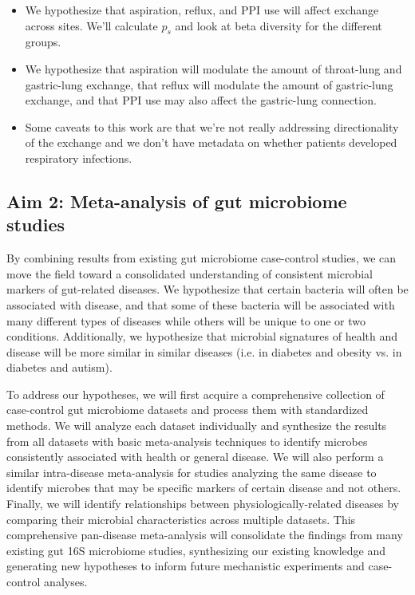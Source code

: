 \documentclass[12pt]{article}
\begin{document}
\begin{itemize}
\item We hypothesize that aspiration, reflux, and PPI use will affect exchange across sites. We'll calculate $p_s$ and look at beta diversity for the different groups.
\item We hypothesize that aspiration will modulate the 
amount of throat-lung and gastric-lung exchange, that reflux will modulate 
the amount of gastric-lung exchange, and that PPI use may also affect
the gastric-lung connection.
\item Some caveats to this work are that we're not really addressing directionality of the exchange and we don't have metadata on whether patients developed respiratory infections.
\end{itemize}

\subsection{Aim 2: Meta-analysis of gut microbiome studies}\label{sec:aim2}
By combining results from existing gut microbiome case-control 
studies, we can move the field toward a consolidated understanding of 
consistent microbial markers of gut-related diseases. We hypothesize 
that certain bacteria will often be associated with disease, and that 
some of these bacteria will be associated with many different types of 
diseases while others will be unique to one or two conditions. 
Additionally, we hypothesize that microbial signatures  of health and 
disease will be more similar in similar diseases (i.e. in diabetes and 
obesity vs. in diabetes and autism).

To address our hypotheses, we will first acquire a comprehensive
collection of case-control gut microbiome datasets and process them
with standardized methods. We will analyze each dataset individually
and synthesize the results from all datasets with basic meta-analysis 
techniques to identify microbes consistently associated with health or 
general disease. We will also perform a similar intra-disease meta-analysis 
for studies analyzing the same disease to identify microbes
that may be specific markers of certain disease and not others.
Finally, we will identify relationships between physiologically-related 
diseases by comparing their microbial characteristics across multiple
datasets. This comprehensive pan-disease meta-analysis will
consolidate the findings from many existing gut 16S microbiome studies,
synthesizing our existing knowledge and generating new hypotheses to
inform future mechanistic experiments and case-control analyses.
\end{document}
